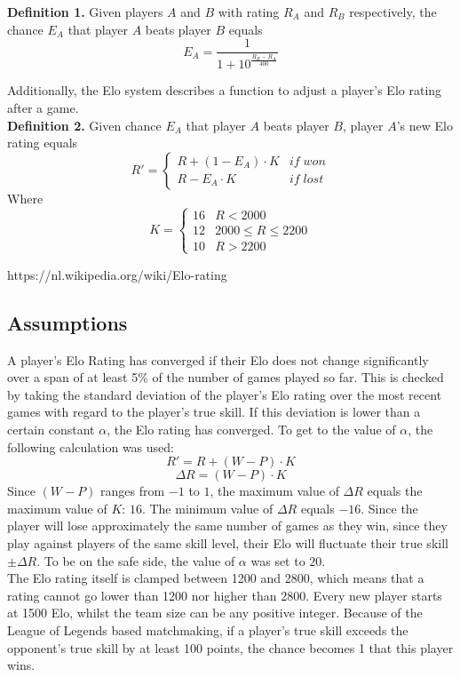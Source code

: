 \documentclass[12pt]{article}
\begin{document}
\textbf{Definition 1.} Given players $A$ and $B$ with rating $R_A$ and $R_B$ respectively, the chance $E_A$ that player $A$ beats player $B$ equals
\[ E_A = \frac{1}{1 + 10^{\frac{R_{B}-R_{A}}{400}}} \]

Additionally, the Elo system describes a function to adjust a player’s Elo rating after a game.\\

\textbf{Definition 2.} Given chance $E_A$ that player $A$ beats player $B$, player $A$'s new Elo rating equals
\[R' = \begin{cases}
R + (1 - E_A ) \cdot K & if \; won \\ R - E_A \cdot K & if \; lost
\end{cases}\]
Where
\[ K = \begin{cases}
16 & R < 2000 \\ 12 & 2000 \leq R \leq 2200 \\ 10 & R > 2200 
\end{cases}\]

https://nl.wikipedia.org/wiki/Elo-rating


\subsection{Assumptions}
A player’s Elo Rating has converged if their Elo does not change significantly over a span of at least 5\% of the number of games played so far. This is checked by taking the standard deviation of the player's Elo rating over the most recent games with regard to the player’s true skill. If this deviation is lower than a certain constant $\alpha$, the Elo rating has converged. To get to the value of $\alpha$, the following calculation was used:
\[R' = R + (W - P) \cdot K\]
\[\Delta R = (W - P) \cdot K\]
Since $(W - P)$ ranges from $-1$ to $1$, the maximum value of $\Delta R$ equals the maximum value of $K$: $16$. The minimum value of $\Delta R$ equals $-16$. Since the player will lose approximately the same number of games as they win, since they play against players of the same skill level, their Elo will fluctuate their true skill $\pm \Delta R$. To be on the safe side, the value of $\alpha$ was set to $20$.\\
The Elo rating itself is clamped between 1200 and 2800, which means that a rating cannot go lower than 1200 nor higher than 2800. Every new player starts at 1500 Elo, whilst the team size can be any positive integer.
Because of the League of Legends based matchmaking, if a player's true skill exceeds the opponent's true skill by at least 100 points, the chance becomes 1 that this player wins.\\
\end{document}

